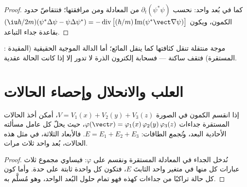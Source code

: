 \begin{proof}
كما في بُعد واحد: نحسب $\partial_t(\psi^*\psi)$ من المعادلة ومن
مرافقتها؛ فتتقاصّ حدود الكمون، ويكون $(\iu\hbar/2m)
(\psi^*\Delta\psi - \psi\Delta\psi^*) =
-\operatorname{div}\big[(\hbar/m)\operatorname{Im}(\psi^*\vect\nabla
\psi)\big]$ بقاعدة جداء التباعد.
\end{proof}

\begin{omfigure}

{\small {}: موجة منتقلة تنقل كثافتها
كما ينقل المائع؛ أما الدالة الموجية الحقيقية (المقيدة المستقرة)
فتقف ساكنة --- فسحابة إلكترون الذرة لا تدور إلا إذا كانت الحالة
عقدية.}
\end{omfigure}

\section{العلب والانحلال وإحصاء الحالات}

\begin{theorem}\label{thm:b3:schrodinger-three-dimensions:separation}
إذا انقسم الكمون في الصورة $V = V_1(x) + V_2(y) + V_3(z)$، أمكن
أخذ الحالات المستقرة جداءات
$\varphi(\vect r) = \varphi_1(x)\,\varphi_2(y)\,\varphi_3(z)$، حيث
يحلّ كل عامل مسألته الأحادية البعد، و\emph{تُجمع}
الطاقات: $E = E_1 + E_2 + E_3$. فالأبعاد الثلاثة، في مثل هذه الحالات،
بُعد واحد ثلاث مرات.
\end{theorem}

\begin{proof}
نُدخل الجداء في المعادلة المستقرة ونقسم على
$\varphi$: فيساوي مجموع ثلاث عبارات كل منها في متغير واحد
الثابتَ $E$، فتكون كل واحدة ثابتة على حدة. وأما كون كل حالة
تراكبًا من جداءات كهذه فهو تمام حلول البُعد الواحد، وهو مُسلَّم به.
\end{proof}

